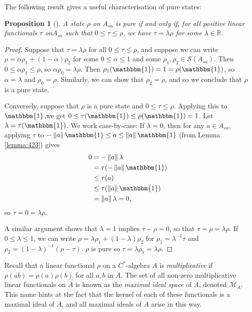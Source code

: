 \documentclass[11pt,a4paper]{report}
\theoremstyle{plain}
\newtheorem{prop}{Proposition}
\theoremstyle{definition}
\newcommand{\1}{\mathbbm{1}}
\newcommand{\R}{\mathbb{R}}
\newcommand{\M}{\mathcal{M}}
\renewcommand{\S}{\mathscr{S}}
\begin{document}
The following result gives a useful characterisation of pure states:
\begin{prop}[{\cite[3.4.6]{kadison83}}]\label{prop:pure2}
	A state $\rho$ on $A_{sa}$ is pure if and only if, for all positive linear 
	functionals $\tau$ on$A_{sa}$ such that $0\leq\tau\leq\rho$, we have $\tau 
	=\lambda\rho$ for some $\lambda\in\R$. 

\end{prop}
\begin{proof}
	Suppose that $\tau =\lambda\rho$ for all $0\leq\tau\leq\rho$, and suppose we can 
	write $\rho=\alpha\rho_1+(1-\alpha)\rho_2$ for some $0\leq\alpha\leq1$ and some 
	$\rho_1,\rho_2 \in\S(A_{sa})$. Then $0\leq\alpha\rho_1\leq\rho$, so 
	$\alpha\rho_0 = \lambda\rho$. Then $\rho_1(\1)=1=\rho(\1)$, so $\alpha = 
	\lambda$ and $\rho_0 =\rho$. Similarly, we can show that $\rho_2=\rho$, and so 
	we conclude that $\rho$ is a pure state.

	
	Conversely, suppose that $\rho$ is a pure state and $0\leq\tau\leq\rho$. 
	Applying this to $\1$,we get $0\leq\tau(\1)\leq\rho(\1) = 1$. Let $\lambda = 
	\tau(\1)$. We work case-by-case: If $\lambda=0$, then for any $a\in A_{sa}$, 
	applying $\tau$ to $-\left\|a\right\|\1 \leq a \leq\left\|a\right\|\1$ (from 
	Lemma \ref{lemma:423}) gives
	\begin{align*}
		0&=		-\left\|a\right\|\lambda 													\\
		&= 		\tau(-\left\|a\right\|\1) 													\\
		&\leq 	\tau(a) 																	\\
		&\leq 	\tau(\left\|a\right\|\1) 													\\
		&= 		\left\|a\right\| \lambda = 0,
	\end{align*}
	so $\tau=0=\lambda\rho$.
	
	A similar argument shows that $\lambda=1$ implies $\tau-\rho=0$, so that 
	$\tau=\rho=\lambda\rho$. If $0\leq\lambda\leq 1$, we can write 
	$\rho=\lambda\rho_1+(1-\lambda)\rho_2$ for $\rho_1=\lambda^{-1}\tau$ and 
	$\rho_2=(1-\lambda)^{-1}(\rho-\tau)$. $\rho$ is pure so 
	$\tau=\lambda\rho_1=\lambda\rho$.

	
\end{proof}
Recall that a linear functional $\rho$ on a $C^\ast$-algebra $A$ is 
\emph{multiplicative} if $\rho(ab)=\rho(a)\rho(b)$ for all $a,b$ in $A$. The set 
of all non-zero multiplicative linear functionals on $A$ is known as the 
\emph{maximal ideal space} of $A$, denoted $\M_A$. This name hints at the fact 
that the kernel of each of these functionals is a maximal ideal of $A$, and all 
maximal ideals of $A$ arise in this way. \cite[Theorem I.2.5]{davidson96}
\end{document}
